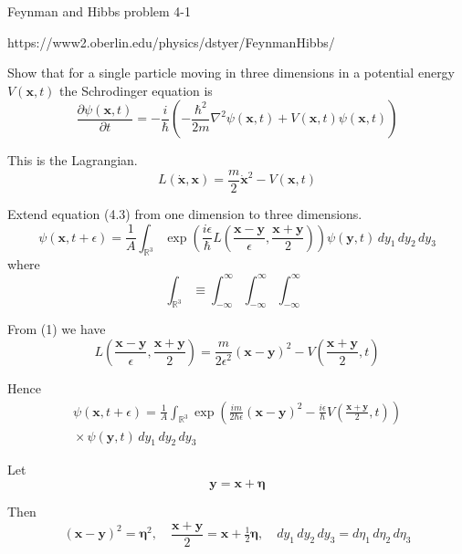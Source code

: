 \documentclass[12pt]{article}
\begin{document}
Feynman and Hibbs problem 4-1

https://www2.oberlin.edu/physics/dstyer/FeynmanHibbs/

\bigskip
Show that for a single particle moving in three dimensions
in a potential energy $V(\mathbf x,t)$ the Schrodinger equation is
\begin{equation*}
\frac{\partial\psi(\mathbf x,t)}{\partial t}
=-\frac{i}{\hbar}\left(
-\frac{\hbar^2}{2m}\nabla^2\psi(\mathbf x,t)+V(\mathbf x,t)\psi(\mathbf x,t)\right)
\end{equation*}

This is the Lagrangian.
\begin{equation*}
L(\dot{\mathbf x},\mathbf x)=\frac{m}{2}\dot{\mathbf x}^2-V(\mathbf{x},t)\tag{1}
\end{equation*}

Extend equation (4.3) from one dimension to three dimensions.
\begin{equation*}
\psi(\mathbf{x},t+\epsilon)
=\frac{1}{A}\int_{\mathbb R^3}
\exp\left(
\frac{i\epsilon}{\hbar}L
\left(\frac{\mathbf{x}-\mathbf{y}}{\epsilon},\frac{\mathbf{x}+\mathbf{y}}{2}\right)
\right)\psi(\mathbf{y},t)\,dy_1\,dy_2\,dy_3
\end{equation*}
where
\begin{equation*}
\int_{\mathbb R^3}
\equiv\int_{-\infty}^\infty\int_{-\infty}^\infty\int_{-\infty}^\infty
\end{equation*}

From (1) we have
\begin{equation*}
L\left(\frac{\mathbf{x}-\mathbf{y}}{\epsilon},\frac{\mathbf{x}+\mathbf{y}}{2}\right)
=\frac{m}{2\epsilon^2}(\mathbf{x}-\mathbf{y})^2
-V\left(\frac{\mathbf{x}+\mathbf{y}}{2},t\right)
\end{equation*}

Hence
\begin{multline*}
\psi(\mathbf{x},t+\epsilon)=
\frac{1}{A}\int_{\mathbb R^3}
\exp\left(
\frac{im}{2\hbar\epsilon}(\mathbf{x}-\mathbf{y})^2
-\frac{i\epsilon}{\hbar}V\left(\frac{\mathbf{x}+\mathbf{y}}{2},t\right)
\right)
\\
{}\times\psi(\mathbf{y},t)
\,dy_1\,dy_2\,dy_3
\end{multline*}

Let
\begin{equation*}
\mathbf y=\mathbf x+\boldsymbol\eta
\end{equation*}

Then
\begin{equation*}
(\mathbf x-\mathbf y)^2=\boldsymbol\eta^2,\quad
\frac{\mathbf x+\mathbf y}{2}=\mathbf{x}+\tfrac{1}{2}\boldsymbol\eta,\quad
dy_1\,dy_2\,dy_3=d\eta_1\,d\eta_2\,d\eta_3
\end{equation*}
\end{document}
